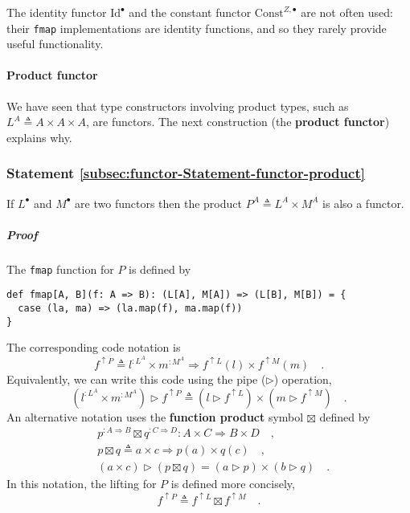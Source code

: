 The identity functor $\text{Id}^{\bullet}$ and the constant functor
$\text{Const}^{Z,\bullet}$ are not often used: their \lstinline!fmap!
implementations are identity functions, and so they rarely provide
useful functionality. 

\paragraph{Product functor}

We have seen that type constructors involving product types, such
as $L^{A}\triangleq A\times A\times A$, are functors. The next construction
(the \textbf{product functor}) explains why.

\subsubsection{Statement \label{subsec:functor-Statement-functor-product}\ref{subsec:functor-Statement-functor-product}}

If $L^{\bullet}$ and $M^{\bullet}$ are two functors then the product
$P^{A}\triangleq L^{A}\times M^{A}$ is also a functor.

\subparagraph{Proof}

The \lstinline!fmap! function for $P$ is defined by
\begin{lstlisting}
def fmap[A, B](f: A => B): (L[A], M[A]) => (L[B], M[B]) = {
  case (la, ma) => (la.map(f), ma.map(f))
}
\end{lstlisting}
The corresponding code notation is
\[
f^{\uparrow P}\triangleq l^{:L^{A}}\times m^{:M^{A}}\Rightarrow f^{\uparrow L}(l)\times f^{\uparrow M}(m)\quad.
\]
Equivalently, we can write this code using the pipe ($\triangleright$)
operation,
\begin{equation}
(l^{:L^{A}}\times m^{:M^{A}})\triangleright f^{\uparrow P}\triangleq(l\triangleright f^{\uparrow L})\times(m\triangleright f^{\uparrow M})\quad.\label{eq:f-def-of-functor-product-lift}
\end{equation}
An alternative notation uses the \textbf{function
product} symbol $\boxtimes$ defined by
\begin{align*}
 & p^{:A\Rightarrow B}\boxtimes q^{:C\Rightarrow D}:A\times C\Rightarrow B\times D\quad,\\
 & p\boxtimes q\triangleq a\times c\Rightarrow p(a)\times q(c)\quad,\\
 & (a\times c)\triangleright\left(p\boxtimes q\right)=\left(a\triangleright p\right)\times\left(b\triangleright q\right)\quad.
\end{align*}
In this notation, the lifting for $P$ is defined more concisely,
\[
f^{\uparrow P}\triangleq f^{\uparrow L}\boxtimes f^{\uparrow M}\quad.
\]

